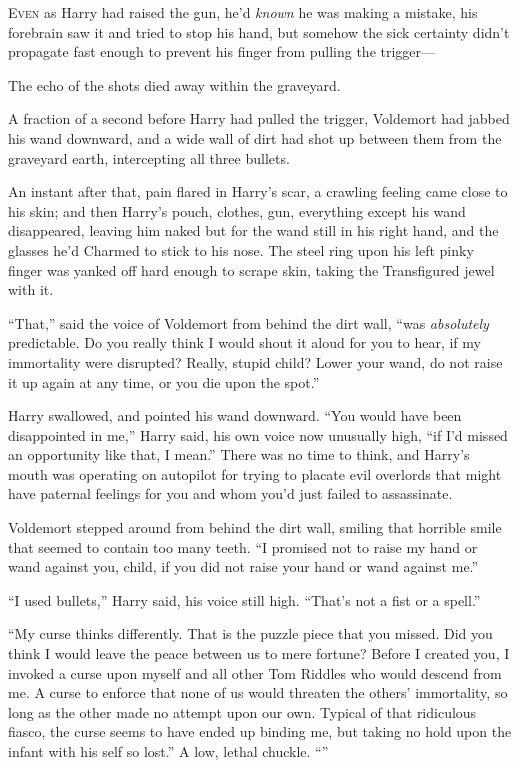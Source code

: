 
\lettrine{E}{ven} as Harry had raised the gun, he’d \emph{known} he was making a mistake, his forebrain saw it and tried to stop his hand, but somehow the sick certainty didn’t propagate fast enough to prevent his finger from pulling the trigger—

The echo of the shots died away within the graveyard.

A fraction of a second before Harry had pulled the trigger, Voldemort had jabbed his wand downward, and a wide wall of dirt had shot up between them from the graveyard earth, intercepting all three bullets.

An instant after that, pain flared in Harry’s scar, a crawling feeling came close to his skin; and then Harry’s pouch, clothes, gun, everything except his wand disappeared, leaving him naked but for the wand still in his right hand, and the glasses he’d Charmed to stick to his nose. The steel ring upon his left pinky finger was yanked off hard enough to scrape skin, taking the Transfigured jewel with it.

“That,” said the voice of Voldemort from behind the dirt wall, “was \emph{absolutely} predictable. Do you really think I would shout it aloud for you to hear, if my immortality were disrupted? Really, stupid child? Lower your wand, do not raise it up again at any time, or you die upon the spot.”

Harry swallowed, and pointed his wand downward.
“You would have been disappointed in me,” Harry said, his own voice now unusually high, “if I’d missed an opportunity like that, I mean.” There was no time to think, and Harry’s mouth was operating on autopilot for trying to placate evil overlords that might have paternal feelings for you and whom you’d just failed to assassinate.

Voldemort stepped around from behind the dirt wall, smiling that horrible smile that seemed to contain too many teeth.
“I promised not to raise my hand or wand against you, child, if you did not raise your hand or wand against me.”

“I used bullets,” Harry said, his voice still high.
“That’s not a fist or a spell.”

“My curse thinks differently. That is the puzzle piece that you missed. Did you think I would leave the peace between us to mere fortune? Before I created you, I invoked a curse upon myself and all other Tom Riddles who would descend from me. A curse to enforce that none of us would threaten the others’ immortality, so long as the other made no attempt upon our own. Typical of that ridiculous fiasco, the curse seems to have ended up binding me, but taking no hold upon the infant with his self so lost.” A low, lethal chuckle. “”

